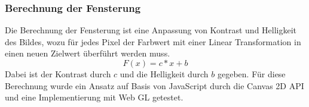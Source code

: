 \subsubsection{Berechnung der Fensterung}
\label{sec:Berehnung der Fensterung}
Die Berechnung der Fensterung ist eine Anpassung von Kontrast und Helligkeit des Bildes,
wozu für jedes Pixel der Farbwert mit einer Linear Transformation in einen neuen Zielwert überführt werden muss.
\begin{equation}
        F(x) = c*x + b
\end{equation}
Dabei ist der Kontrast durch $c$ und die Helligkeit durch $b$ gegeben.
Für diese Berechnung wurde ein Ansatz auf Basis von JavaScript durch die Canvas 2D API und eine Implementierung mit Web GL getestet.


